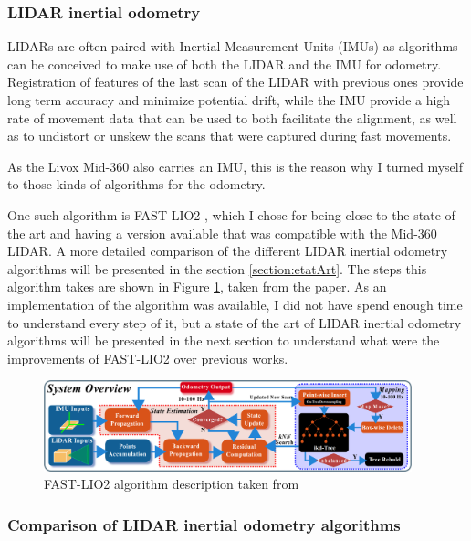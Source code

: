 \documentclass[12pt]{article}
\begin{document}
        \subsubsection{LIDAR inertial odometry}
        \label{section:lidar_inertial_odometry}
        LIDARs are often paired with Inertial Measurement Units (IMUs) as algorithms can be conceived to make use of both the LIDAR and the IMU for odometry. Registration of features of the last scan of the LIDAR with previous ones provide long term accuracy and minimize potential drift, while the IMU provide a high rate of movement data that can be used to both facilitate the alignment, as well as to undistort or unskew the scans that were captured during fast movements.
        
        As the Livox Mid-360 also carries an IMU, this is the reason why I turned myself to those kinds of algorithms for the odometry. 
        
        One such algorithm is FAST-LIO2 \cite{xu2022fast}, which I chose for being close to the state of the art and having a version available that was compatible with the Mid-360 LIDAR. A more detailed comparison of the different LIDAR inertial odometry algorithms will be presented in the section \ref{section:etatArt}. The steps this algorithm takes are shown in Figure \ref{fig:fastlio2}, taken from the paper. As an implementation of the algorithm was available, I did not have spend enough time to understand every step of it, but a state of the art of LIDAR inertial odometry algorithms will be presented in the next section to understand what were the improvements of FAST-LIO2 over previous works.
        
        \begin{figure}[h]
            \centering
            \includegraphics[width=0.95\textwidth]{Images/overview_fastlio2.png}
            \caption{FAST-LIO2 algorithm description taken from \cite{xu2022fast}}
            \label{fig:fastlio2}
        \end{figure}
        
        \subsubsection{Comparison of LIDAR inertial odometry algorithms}
\end{document}
